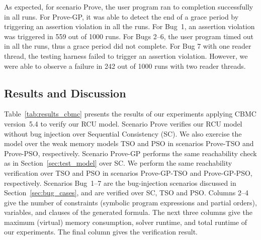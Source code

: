 As expected, for scenario Prove, the user program ran to completion
successfully in all runs.  For Prove-GP, it was able to detect the end of a
grace period by triggering an assertion violation in all the runs.  For
Bug~1, an assertion violation was triggered in 559 out of 1000 runs.  
For Bugs 2--6, the user program timed out in all the runs, 
thus a grace period did not complete. %
For Bug 7 with one reader thread, the testing harness failed to
trigger an assertion violation.  However, we were able to observe a failure in
242 out of 1000 runs with two reader threads.





\subsection{Results and Discussion}

Table~\ref{tab:results_cbmc} presents the results of our experiments
applying CBMC version~5.4 to verify our RCU model.
Scenario Prove verifies our RCU model without
bug injection over Sequential Consistency (SC).  We also exercise the model
over the weak memory models TSO and PSO in scenarios Prove-TSO and Prove-PSO, 
respectively.  Scenario Prove-GP performs the same reachability check as in 
Section~\ref{sec:test_model} over SC.
We perform the same reachability verification over TSO
and PSO in scenarios Prove-GP-TSO and Prove-GP-PSO, respectively.  Scenarios
Bug~1--7 are the bug-injection scenarios discussed in
Section~\ref{sec:bug_cases}, and are verified over SC, TSO and PSO.  Columns
2--4 give the number of constraints (symbolic program expressions and
partial orders), variables, and clauses of the generated
formula.  The next three columns give the maximum (virtual) memory
consumption, solver runtime, and total runtime of our experiments.  The
final column gives the verification result.

